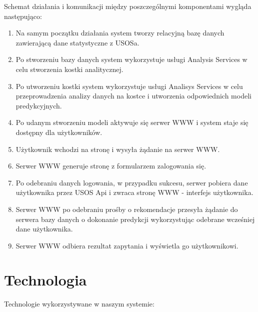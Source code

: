 \documentclass[licencjacka]{pracamgr}
\begin{document}
\newpage

Schemat działania i komunikacji między poszczególnymi komponentami wygląda następująco:
\begin{enumerate}

\item Na samym początku działania system tworzy relacyjną bazę danych zawierającą dane statystyczne z USOSa. 

\item Po stworzeniu bazy danych system wykorzystuje usługi Analysis Services w celu stworzenia kostki analitycznej.

\item Po utworzeniu kostki system wykorzystuje usługi Analisys Services w celu przeprowadzenia analizy
danych na kostce i utworzenia odpowiednich modeli predykcyjnych.

\item Po udanym stworzeniu modeli aktywuje się serwer WWW i system staje się dostępny dla użytkowników. 

\item Użytkownik wchodzi na stronę i wysyła żądanie na serwer WWW.

\item Serwer WWW generuje stronę z formularzem zalogowania się.

\item Po odebraniu danych logowania, w przypadku sukcesu, serwer pobiera dane użytkownika przez USOS Api i zwraca stronę WWW - interfejs użytkownika.

\item Serwer WWW po odebraniu prośby o rekomendacje przesyła żądanie do serwera bazy danych o dokonanie predykcji wykorzystując odebrane wcześniej dane użytkownika.

\item Serwer WWW odbiera rezultat zapytania i wyświetla go użytkownikowi.

\end{enumerate}



 \chapter{Technologia}
Technologie wykorzystywane w naszym systemie: \par
\end{document}
